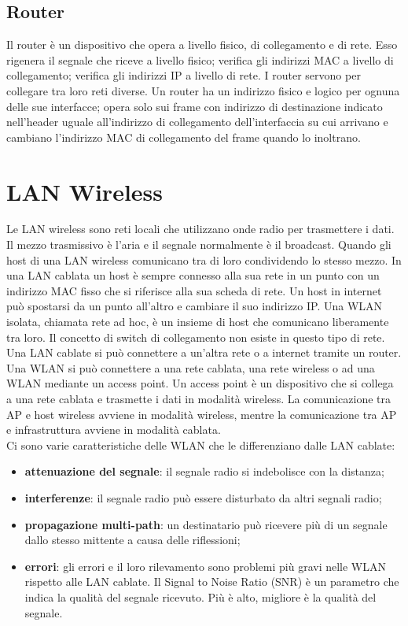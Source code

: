 \documentclass[12pt]{report}
\begin{document}
\subsection{Router}
Il router è un dispositivo che opera a livello fisico, di collegamento e di rete. Esso rigenera il segnale che riceve a livello fisico; verifica gli indirizzi MAC a livello di collegamento; verifica gli indirizzi IP a livello di rete. I router servono per collegare tra loro reti diverse. Un router ha un indirizzo fisico e logico per ognuna delle sue interfacce; opera solo sui frame con indirizzo di destinazione indicato nell'header uguale all'indirizzo di collegamento dell'interfaccia su cui arrivano e cambiano l'indirizzo MAC di collegamento del frame quando lo inoltrano.

\section{LAN Wireless}
Le LAN wireless sono reti locali che utilizzano onde radio per trasmettere i dati. Il mezzo trasmissivo è l'aria e il segnale normalmente è il broadcast. Quando gli host di una LAN wireless comunicano tra di loro condividendo lo stesso mezzo. In una LAN cablata un host è sempre connesso alla sua rete in un punto con un indirizzo MAC fisso che si riferisce alla sua scheda di rete. Un host in internet può spostarsi da un punto all'altro e cambiare il suo indirizzo IP. Una WLAN isolata, chiamata rete ad hoc, è un insieme di host che comunicano liberamente tra loro. Il concetto di switch di collegamento non esiste in questo tipo di rete.
\vspace{\baselineskip}\\
Una LAN cablate si può connettere a un'altra rete o a internet tramite un router. Una WLAN si può connettere a una rete cablata, una rete wireless o ad una WLAN mediante un access point. Un access point è un dispositivo che si collega a una rete cablata e trasmette i dati in modalità wireless. La comunicazione tra AP e host wireless avviene in modalità wireless, mentre la comunicazione tra AP e infrastruttura avviene in modalità cablata. 
\vspace{\baselineskip}\\
Ci sono varie caratteristiche delle WLAN che le differenziano dalle LAN cablate:
\begin{itemize}
	\item \textbf{attenuazione del segnale}: il segnale radio si indebolisce con la distanza;
	\item \textbf{interferenze}: il segnale radio può essere disturbato da altri segnali radio;
	\item \textbf{propagazione multi-path}: un destinatario può ricevere più di un segnale dallo stesso mittente a causa delle riflessioni;
	\item \textbf{errori}: gli errori e il loro rilevamento sono problemi più gravi nelle WLAN rispetto alle LAN cablate. Il Signal to Noise Ratio (SNR) è un parametro che indica la qualità del segnale ricevuto. Più è alto, migliore è la qualità del segnale.
\end{itemize}
\end{document}
